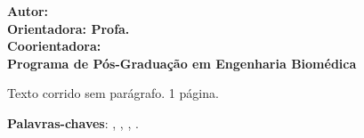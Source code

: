 \begin{resumo}

\begin{center}
\textbf{\imprimirtitulo}
\end{center}

\begin{flushleft}
\footnotesize
\textbf{Autor: \imprimirautor }\\
\textbf{Orientadora: Profa. \imprimirorientador }\\
\textbf{Coorientadora: \imprimirmembroCoorientador} \\
\textbf{Programa de Pós-Graduação em Engenharia Biomédica} \\
\textbf{\imprimirlocal \imprimirdata }
\end{flushleft}

Texto corrido sem parágrafo. 1 página.

\vspace{\onelineskip}
    
 \noindent
 \textbf{Palavras-chaves}: \imprimirpalavrachaveum, \imprimirpalavrachavedois, 
			    \imprimirpalavrachavetres, \imprimirpalavrachavequatro.

\end{resumo}

